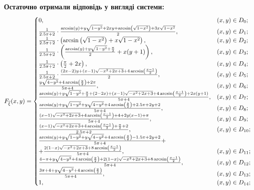 \documentclass[14pt,a4paper]{scrartcl}
\theoremstyle{definition}
\theoremstyle{remark}
\theoremstyle{definition}
\theoremstyle{definition}
\begin{document}
\newpage
\textbf{Остаточно отримали відповідь у вигляді системи:}
$$
F_{\overline{\xi}}(x,y) = \begin{cases}
	0, & (x,y) \in D_{0};\\
	\frac{1}{2.5\pi + 2} \cdot \frac{\arcsin\left(y\right)+y\sqrt{1-y^2}+2xy+\arcsin\left(\sqrt{1-x^2}\right)+3x\sqrt{1-x^2}}{2} , & (x,y) \in D_{1};\\
	 \frac{1}{2.5\pi + 2} \cdot \left( \arcsin\left(\sqrt{1-x^2}\right)+x\sqrt{1-x^2} \right), & (x,y) \in D_{2};\\
	 \frac{1}{2.5\pi + 2} \cdot \left( \frac{\arcsin\left(y\right)+y\sqrt{1-y^2} + \frac{\pi}{2} }{2}+ x(y+1)\right), & (x,y) \in D_{3};\\
	 \frac{1}{2.5\pi + 2} \cdot \left( \frac{\pi}{2}+ 2x\right), & (x,y) \in D_{4};\\
	 \frac{1}{2.5\pi + 2} \cdot \frac{\left(2x-2\right)y+\left(x-1\right)\sqrt{-x^2+2x+3}+4\arcsin\left(\frac{x-1}{2}\right)}{2}, & (x,y) \in D_{5};\\
	 \frac{y\sqrt{4 - y^2} + 4\arcsin\left(\frac{y}{2}\right) + 2\pi }{5\pi +4}, & (x,y) \in D_{6};\\
	 \frac{\arcsin\left(y\right)+y\sqrt{1-y^2} + \frac{\pi}{2} + \left(2-2x\right)+\left(x-1\right)\sqrt{-x^2+2x+3}+4\arcsin\left(\frac{x-1}{2}\right)+ 2x(y+1)}{5\pi + 4},& (x,y) \in D_{7};\\
	 \frac{\arcsin\left(y\right)+y\sqrt{1-y^2} + y\sqrt{4-y^2}+4\arcsin\left(\frac{  y }{2}\right) + 2.5\pi + 2y + 2}{5\pi + 4},& (x,y) \in D_{8};\\
	 \frac{\left(x-1\right)\sqrt{-x^2+2x+3}+4\arcsin\left(\frac{x-1}{2}\right)+4 +2y(x-1) +\pi}{5\pi + 4},& (x,y) \in D_{9};\\
	 \frac{\left(x-1\right)\sqrt{-x^2+2x+3}+4\arcsin\left(\frac{x-1}{2}\right) + \frac{\pi}{2} + 2 }{2.5\pi + 2},& (x,y) \in D_{10};\\
	 \frac{\arcsin\left(y\right)+y\sqrt{1-y^2}+  y  \sqrt{4-y^2}+4\arcsin\left(\frac{y}{2}\right)-  1.5\pi + 2y + 2 }{5\pi + 4}+ \\
	 	 +\frac{2\left(1-x\right)\sqrt{-x^2+2x+3}+8\arcsin\left(\frac{x-1}{2}\right) }{5\pi + 4},& (x,y) \in D_{11};\\
		 \frac{ 4-\pi + y\sqrt{4-y^2}+4\arcsin\left(\frac{y}{2} \right) +2\left(1-x\right)\sqrt{-x^2+2x+3}+8\arcsin\left(\frac{x-1}{2}\right) }{5\pi + 4},& (x,y) \in D_{12};\\
		 \frac{3\pi + 4 + y\sqrt{4-y^2}+4\arcsin\left(\frac{y}{2} \right)}{5\pi + 4},& (x,y) \in D_{13};\\
		 1, & (x,y) \in D_{14};\\
\end{cases}
$$
\end{document}
